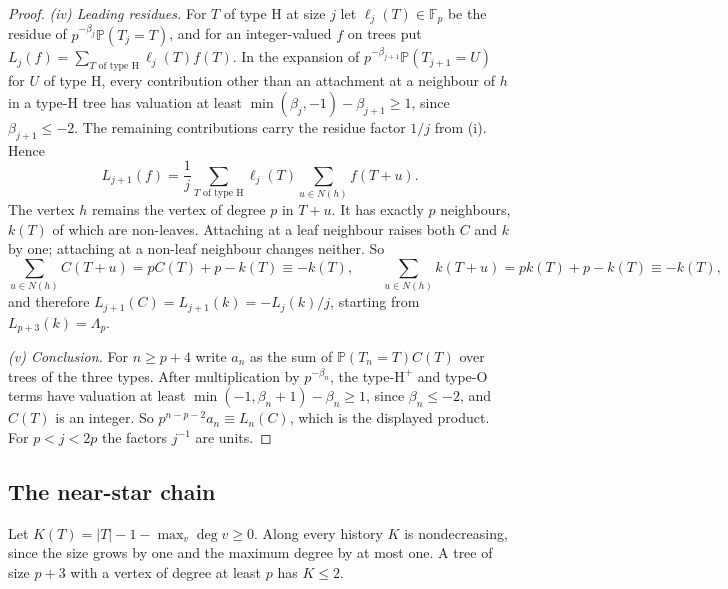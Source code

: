 \documentclass[11pt]{article}
\theoremstyle{remark}
\newcommand{\Prob}{\mathbb P}
\begin{document}
\begin{proof}
\emph{(iv) Leading residues.} For $T$ of type H at size $j$ let $\ell_j(T)\in\mathbb F_p$ be the residue of $p^{-\beta_j}\Prob(T_j=T)$, and for an integer-valued $f$ on trees put $L_j(f)=\sum_{T\text{ of type H}}\ell_j(T)f(T)$. In the expansion of $p^{-\beta_{j+1}}\Prob(T_{j+1}=U)$ for $U$ of type H, every contribution other than an attachment at a neighbour of $h$ in a type-H tree has valuation at least $\min(\beta_j,-1)-\beta_{j+1}\ge1$, since $\beta_{j+1}\le-2$. The remaining contributions carry the residue factor $1/j$ from (i). Hence
\[
 L_{j+1}(f)=\frac1j\sum_{T\text{ of type H}}\ell_j(T)\sum_{u\in N(h)}f(T+u).
\]
The vertex $h$ remains the vertex of degree $p$ in $T+u$. It has exactly $p$ neighbours, $k(T)$ of which are non-leaves. Attaching at a leaf neighbour raises both $C$ and $k$ by one; attaching at a non-leaf neighbour changes neither. So
\[
 \sum_{u\in N(h)}C(T+u)=pC(T)+p-k(T)\equiv-k(T),\qquad
 \sum_{u\in N(h)}k(T+u)=pk(T)+p-k(T)\equiv-k(T),
\]
and therefore $L_{j+1}(C)=L_{j+1}(k)=-L_j(k)/j$, starting from $L_{p+3}(k)=\Lambda_p$.

\emph{(v) Conclusion.} For $n\ge p+4$ write $a_n$ as the sum of $\Prob(T_n=T)C(T)$ over trees of the three types. After multiplication by $p^{-\beta_n}$, the type-$\mathrm H^+$ and type-O terms have valuation at least $\min(-1,\beta_n+1)-\beta_n\ge1$, since $\beta_n\le-2$, and $C(T)$ is an integer. So $p^{n-p-2}a_n\equiv L_n(C)$, which is the displayed product. For $p<j<2p$ the factors $j^{-1}$ are units.
\end{proof}

\subsection{The near-star chain}
Let $K(T)=|T|-1-\max_v\deg v\ge0$. Along every history $K$ is nondecreasing, since the size grows by one and the maximum degree by at most one. A tree of size $p+3$ with a vertex of degree at least $p$ has $K\le2$.
\end{document}
